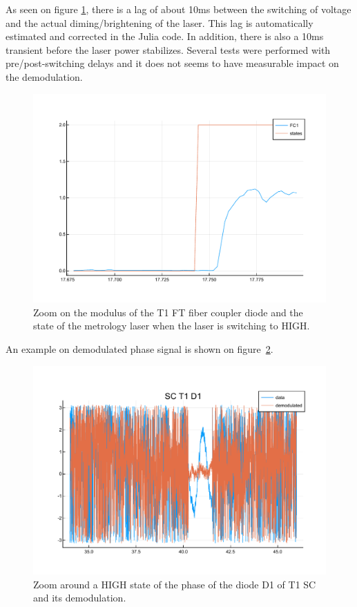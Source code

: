 \documentclass[a4paper,11pt,twoside]{scrartcl}
\begin{document}
As seen on figure \ref{fig:faintzoom}, there is a lag of about 10ms between the switching of voltage and the actual diming/brightening of the laser. This lag is automatically estimated and corrected in the Julia code. 
In addition, there is also a 10ms transient before the laser power stabilizes. Several tests were performed with pre/post-switching delays and it does not seems to have measurable impact on the demodulation.
\begin{figure}
    \centering
    \includegraphics[width=0.6\linewidth]{figs/FaintStatesZoom.pdf}
    \caption{Zoom on the modulus of the T1 FT fiber coupler diode and the state of the metrology laser when the laser is switching to HIGH.}
    \label{fig:faintzoom}
\end{figure}

An example on demodulated phase signal is shown on figure~\ref{fig:FaintDemodulated}.
\begin{figure}
    \centering
    \includegraphics[width=0.8\linewidth]{figs/FaintDemodulated.pdf}
    \caption{Zoom around a HIGH state of the phase of the diode D1 of T1 SC and its demodulation.}
    \label{fig:FaintDemodulated}
\end{figure}
\end{document}
